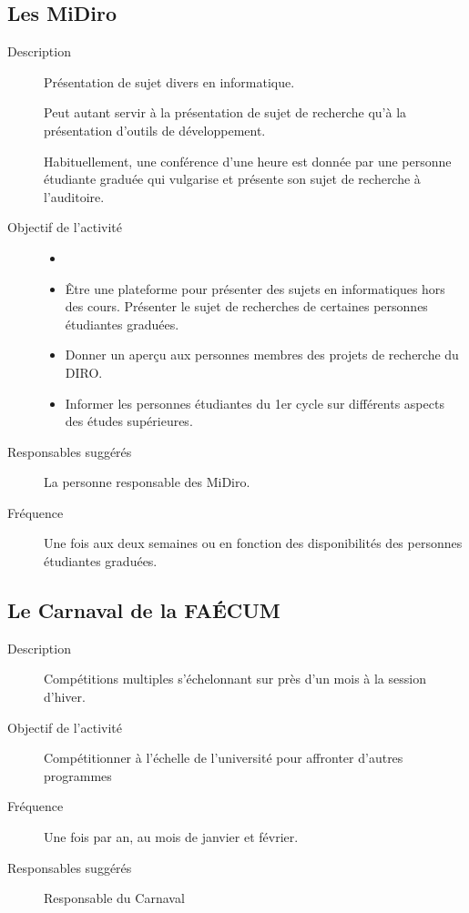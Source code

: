 \documentclass{aediroum}
\begin{document}
\subsection{Les MiDiro}\label{sec:midiros}

\begin{description}
    \item[Description] Présentation de sujet divers en informatique.

	Peut autant servir à la présentation de sujet de recherche qu'à la présentation d'outils de développement.

	Habituellement, une conférence d'une heure est donnée par une personne étudiante graduée qui vulgarise et présente son sujet de recherche à l’auditoire.
    \item[Objectif de l'activité]
    \begin{itemize}
        \item[]
        \item Être une plateforme pour présenter des sujets en informatiques hors des cours. Présenter le sujet de recherches de certaines personnes étudiantes graduées.
        \item Donner un aperçu aux personnes membres des projets de recherche du DIRO.
        \item Informer les personnes étudiantes du 1er cycle sur différents aspects des études supérieures.
    \end{itemize}
    \item[Responsables suggérés] La personne responsable des MiDiro.
    \item[Fréquence] Une fois aux deux semaines ou en fonction des disponibilités des personnes étudiantes graduées.
\end{description}

\subsection{Le Carnaval de la FAÉCUM}\label{sec:carnaval}

\begin{description}
    \item[Description] Compétitions multiples s'échelonnant sur près d'un mois à la session d'hiver.
    \item[Objectif de l'activité] Compétitionner à l'échelle de l'université pour affronter d'autres programmes
    \item[Fréquence] Une fois par an, au mois de janvier et février.
    \item[Responsables suggérés] Responsable du Carnaval
\end{description}
\end{document}
